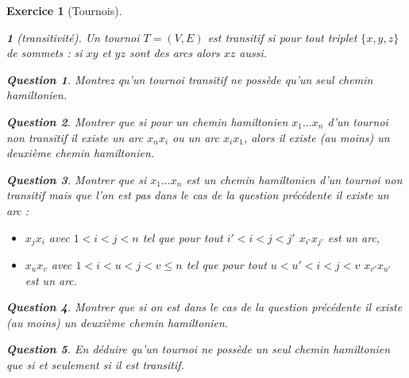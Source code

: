 \documentclass{article}
\theoremstyle{exostyle}
\newtheorem{exo}{Exercice}
\theoremstyle{partiestyle}
\newtheorem{partie}{}[exo]
\theoremstyle{questionstyle}
\newtheorem{questionpartie}{Question}[partie]
\begin{document}
\begin{exo}[Tournois]
\begin{partie}[transitivité]
	Un tournoi $T = (V, E)$ est transitif si pour tout triplet $\{x, y, z\}$ de sommets : si $xy$ et $yz$ sont des arcs alors $xz$ aussi.
	\begin{questionpartie}
		Montrez qu'un tournoi transitif ne possède qu'un seul chemin hamiltonien.
	\end{questionpartie}
	\begin{questionpartie}
		Montrer que si pour un chemin hamiltonien $x_1\dots x_n$ d'un tournoi non transitif il existe un arc $x_nx_i$ ou un arc $x_ix_1$, alors il existe (au moins) un deuxième chemin hamiltonien.
	\end{questionpartie}
	\begin{questionpartie}
		Montrer que si $x_1\dots x_n$ est un chemin hamiltonien d'un tournoi non transitif mais que l'on est pas dans le cas de la question précédente il existe un arc :
		\begin{itemize}
			\item $x_jx_i$ avec $1< i < j < n$ tel que pour tout $i'< i < j < j'$ $x_{i'}x_{j'}$ est un arc,
			\item $x_ux_v$ avec $1< i < u < j < v \leq n$ tel que pour tout $ u < u' < i < j < v$ $x_{v'}x_{u'}$ est un arc.
		\end{itemize}
	\end{questionpartie}
	\begin{questionpartie}
		Montrer que si on est dans le cas de la question précédente il existe (au moins) un deuxième chemin hamiltonien.
	\end{questionpartie}
	\begin{questionpartie}
		En déduire qu'un tournoi ne possède un seul chemin hamiltonien que si et seulement si il est transitif.
	\end{questionpartie}

\end{partie}


\end{exo}
\end{document}
